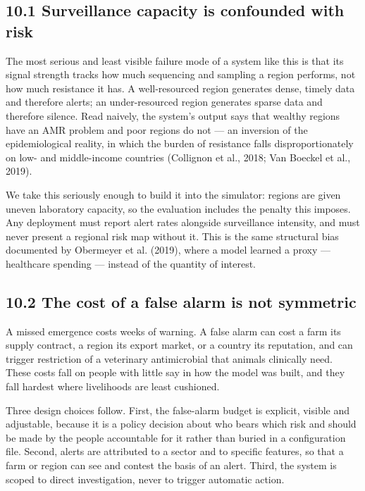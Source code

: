 \documentclass[11pt,a4paper]{article}
\begin{document}
\subsection*{10.1 Surveillance capacity is confounded with risk}

The most serious and least visible failure mode of a system like this is that its signal strength tracks how much sequencing and sampling a region performs, not how much resistance it has. A well-resourced region generates dense, timely data and therefore alerts; an under-resourced region generates sparse data and therefore silence. Read naively, the system's output says that wealthy regions have an AMR problem and poor regions do not — an inversion of the epidemiological reality, in which the burden of resistance falls disproportionately on low- and middle-income countries (Collignon et al., 2018; Van Boeckel et al., 2019).

We take this seriously enough to build it into the simulator: regions are given uneven laboratory capacity, so the evaluation includes the penalty this imposes. Any deployment must report alert rates alongside surveillance intensity, and must never present a regional risk map without it. This is the same structural bias documented by Obermeyer et al. (2019), where a model learned a proxy — healthcare spending — instead of the quantity of interest.

\subsection*{10.2 The cost of a false alarm is not symmetric}

A missed emergence costs weeks of warning. A false alarm can cost a farm its supply contract, a region its export market, or a country its reputation, and can trigger restriction of a veterinary antimicrobial that animals clinically need. These costs fall on people with little say in how the model was built, and they fall hardest where livelihoods are least cushioned.

Three design choices follow. First, the false-alarm budget is explicit, visible and adjustable, because it is a policy decision about who bears which risk and should be made by the people accountable for it rather than buried in a configuration file. Second, alerts are attributed to a sector and to specific features, so that a farm or region can see and contest the basis of an alert. Third, the system is scoped to direct investigation, never to trigger automatic action.
\end{document}
